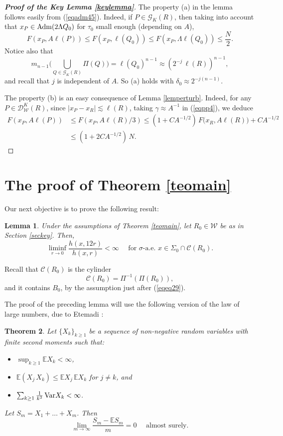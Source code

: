 \documentclass[11pt]{amsart}
\newcommand{\E}{{\mathbb E}}
\newcommand{\DD}{{\mathcal D}}
\newcommand{\WW}{{\mathcal W}}
\newcommand{\GZ}{{\mathcal G}}
\newcommand{\CC}{{\mathcal C}}
\newcommand{\rf}[1]{{(\ref{#1})}}
\newcommand{\vv}{{\vspace{2mm}}}
\newtheorem{theorem}{Theorem}[section]
\newtheorem{lemma}[theorem]{Lemma}
\theoremstyle{definition}
\theoremstyle{remark}
\numberwithin{equation}{section}
\begin{document}
\begin{proof}[\bf Proof of the Key Lemma \ref{keylemma}]
The property (a) in the lemma follows easily from \rf{eqadm45}. Indeed, if $P\in \GZ_K(R)$,
then taking into account that $x_P\in{\rm Adm}(2\Lambda Q_0)$ for $\tau_0$ small enough (depending on $A$),
$$F(x_P,A\ell(P))\leq F(x_P,\ell(Q_0))\leq F(x_P,\Lambda\ell(Q_0)) \leq \frac N2.$$
Notice also that 
$$m_{n-1}\Big(\bigcup_{Q\in \GZ_K(R)} \Pi(Q)\Big) = \ell(Q_0)^{n-1} \approx (2^{-j}\,\ell(R))^{n-1},
$$
and recall that $j$ is independent of $A$. So (a) holds with $\delta_0\approx 2^{-j(n-1)}$.

The property (b) is an easy consequence of Lemma \ref{lemperturb}.
Indeed, for any $P\in\DD_\WW^K(R)$, since 
$|x_P- x_R|\lesssim \ell(R)$, taking $\gamma\approx A^{-1}$ in \rf{eqpp4}, we deduce
\begin{align*}
F(x_P,A\ell(P))&\leq F(x_P,A\ell(R)/3) \leq (1+C A^{-1/2}) \,F\big(x_R, A\ell(R)\big) + CA^{-1/2}\\
&\leq (1+2C A^{-1/2}) \,N.
\end{align*}
\end{proof}
\vv



\section{The proof of Theorem \ref{teomain}}

Our next objective is to prove the following result:

\begin{lemma}\label{lemliminf}
Under the assumptions of Theorem \ref{teomain}, let $R_0\in \WW$ be as in Section \ref{seckey}.
Then, 
$$\liminf_{r\to 0} \frac{h(x,12r)}{h(x,r)} <\infty
\quad\mbox{ for $\sigma$-a.e.\ $x\in \Sigma_0 \cap \CC(R_0)$.}$$
\end{lemma}

Recall that $\CC(R_0)$ is the cylinder
$$\CC(R_0) = \Pi^{-1}(\Pi(R_0)),$$
and it contains $B_0$, by the assumption just after \rf{eqeq29}.
\vv

The proof of the preceding lemma will use the following version of the law of large numbers, due to
Etemadi \cite{Etemadi}:

\begin{theorem}\label{teoete}
Let $\{ X_k\}_{k\geq1}$ be a sequence of non-negative random variables with finite second
moments such that:
\begin{itemize}
\item[(a)] $\sup_{k\geq1} \E X_k< \infty$,
\item[(b)] $\E(X_j\,X_k) \leq \E X_j\,\E X_k$ for $j\neq k$, and
\item[(c)] $\sum_{k\geq1} \frac1{k^2}\,{\rm Var} X_k <\infty$.
\end{itemize}
Let $S_m = X_1+\ldots+X_m$. Then
$$\lim_{m\to\infty} \frac{S_m - \E S_m}{m} = 0 \quad \mbox{ almost surely}.$$
\end{theorem}
\end{document}
